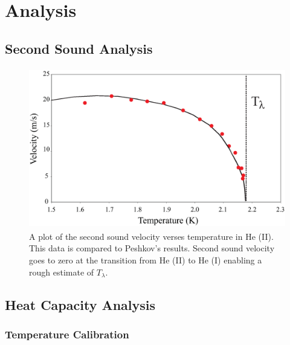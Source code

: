 
\section{Analysis}\label{analysis}
\subsection{Second Sound Analysis}\label{analysis}

\begin{figure}[htbp]
\begin{center}
\includegraphics[height=70mm]{./figures/secondsound.eps}
\caption{\small{A plot of the second sound velocity verses temperature in He (II).  This data is compared to Peshkov's results.\cite{peshkov} Second sound velocity goes to zero at the transition from He (II) to He (I) enabling a rough estimate of $T_{\lambda}$.}}
\label{fig:secondsound}
\end{center}
\end{figure}


\subsection{Heat Capacity Analysis}\label{heatcapacityanalysis}
\subsubsection{Temperature Calibration}\label{temperaturecalibration}


